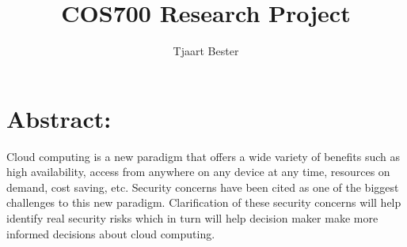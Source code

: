 \documentclass[11pt]{article}
\author{Tjaart Bester}
\begin{document}
\title{COS700 Research Project}
\maketitle


\section{Abstract:}
Cloud computing is a new paradigm that offers a wide variety of  benefits such as high availability, access from anywhere on any device at any time, resources on demand, cost saving, etc. Security concerns have been cited as one of the biggest challenges to this new paradigm. Clarification of these security concerns will help identify real security risks which in turn will help decision maker make more informed decisions about cloud computing. \\
\end{document}
